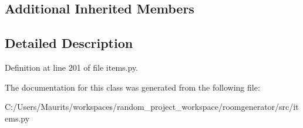 \subsection*{Additional Inherited Members}


\subsection{Detailed Description}


Definition at line 201 of file items.\+py.



The documentation for this class was generated from the following file\+:\begin{DoxyCompactItemize}
\item 
C\+:/\+Users/\+Maurits/workspaces/random\+\_\+project\+\_\+workspace/roomgenerator/src/items.\+py\end{DoxyCompactItemize}
